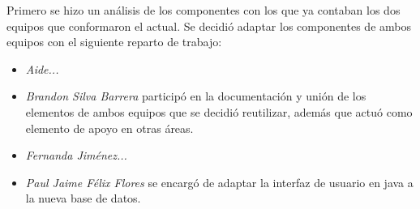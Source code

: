 \documentclass[10pt]{article}
\begin{document}
Primero se hizo un análisis de los componentes con los que ya contaban los dos equipos que conformaron el actual. Se decidió adaptar los componentes de ambos equipos con el siguiente reparto de trabajo:


\begin{itemize}
\item \textit{Aide...} 
\item \textit{Brandon Silva Barrera} participó en la documentación y unión de los elementos de ambos equipos que se decidió reutilizar, además que actuó como elemento de apoyo en otras áreas. 
\item \textit{Fernanda Jiménez...} 
\item \textit{Paul Jaime Félix Flores} se encargó de adaptar la interfaz de usuario en java a la nueva base de datos. 
\end{itemize}
\end{document}
